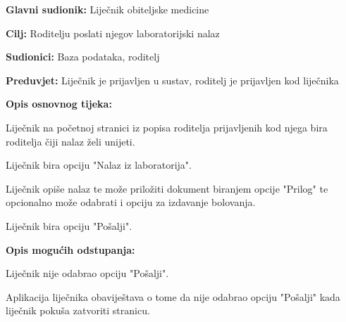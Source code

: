 					\noindent {}
					\begin{packed_item}
						
						\item \textbf{Glavni sudionik: }Liječnik obiteljske medicine
						\item  \textbf{Cilj:} Roditelju poslati njegov laboratorijski nalaz 
						\item  \textbf{Sudionici:} Baza podataka, roditelj
						\item  \textbf{Preduvjet:} Liječnik je prijavljen u sustav, roditelj je prijavljen kod liječnika
						\item  \textbf{Opis osnovnog tijeka:}
						
						\item[] \begin{packed_enum}
							
							\item Liječnik na početnoj stranici iz popisa roditelja prijavljenih kod njega bira roditelja čiji nalaz želi unijeti.
							\item Liječnik bira opciju "Nalaz iz laboratorija".
							\item Liječnik opiše nalaz te može priložiti dokument biranjem opcije "Prilog" te opcionalno može odabrati i opciju za izdavanje bolovanja.
							\item Liječnik bira opciju "Pošalji".
						\end{packed_enum}
						
						\item  \textbf{Opis mogućih odstupanja:}
						
						\item[] \begin{packed_item}
							
							\item[4.a] Liječnik nije odabrao opciju "Pošalji".
							\item[] \begin{packed_enum}
								
								\item Aplikacija liječnika obaviještava o tome da nije odabrao opciju "Pošalji" kada liječnik pokuša zatvoriti stranicu.
							\end{packed_enum}
							
							
						\end{packed_item}
						
						
					\end{packed_item}
					
